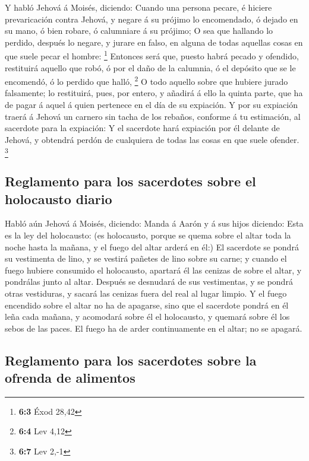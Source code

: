  Y habló Jehová á Moisés, diciendo:  Cuando una
persona pecare, é hiciere prevaricación contra Jehová, y negare á su
prójimo lo encomendado, ó dejado en su mano, ó bien robare, ó calumniare
á su prójimo;  O sea que hallando lo perdido, después lo
negare, y jurare en falso, en alguna de todas aquellas cosas en que
suele pecar el hombre: \footnote{\textbf{6:3} Éxod 28,42} 
Entonces será que, puesto habrá pecado y ofendido, restituirá aquello
que robó, ó por el daño de la calumnia, ó el depósito que se le
encomendó, ó lo perdido que halló, \footnote{\textbf{6:4} Lev 4,12}
 O todo aquello sobre que hubiere jurado falsamente; lo
restituirá, pues, por entero, y añadirá á ello la quinta parte, que ha
de pagar á aquel á quien pertenece en el día de su expiación.
 Y por su expiación traerá á Jehová un carnero sin tacha de
los rebaños, conforme á tu estimación, al sacerdote para la expiación:
 Y el sacerdote hará expiación por él delante de Jehová, y
obtendrá perdón de cualquiera de todas las cosas en que suele ofender.
\footnote{\textbf{6:7} Lev 2,-1}

\hypertarget{reglamento-para-los-sacerdotes-sobre-el-holocausto-diario}{%
\subsection{Reglamento para los sacerdotes sobre el holocausto
diario}\label{reglamento-para-los-sacerdotes-sobre-el-holocausto-diario}}

 Habló aún Jehová á Moisés, diciendo:  Manda á
Aarón y á sus hijos diciendo: Esta es la ley del holocausto: (es
holocausto, porque se quema sobre el altar toda la noche hasta la
mañana, y el fuego del altar arderá en él:)  El sacerdote
se pondrá su vestimenta de lino, y se vestirá pañetes de lino sobre su
carne; y cuando el fuego hubiere consumido el holocausto, apartará él
las cenizas de sobre el altar, y pondrálas junto al altar. 
Después se desnudará de sus vestimentas, y se pondrá otras vestiduras, y
sacará las cenizas fuera del real al lugar limpio.  Y el
fuego encendido sobre el altar no ha de apagarse, sino que el sacerdote
pondrá en él leña cada mañana, y acomodará sobre él el holocausto, y
quemará sobre él los sebos de las paces.  El fuego ha de
arder continuamente en el altar; no se apagará.

\hypertarget{reglamento-para-los-sacerdotes-sobre-la-ofrenda-de-alimentos}{%
\subsection{Reglamento para los sacerdotes sobre la ofrenda de
alimentos}\label{reglamento-para-los-sacerdotes-sobre-la-ofrenda-de-alimentos}}

